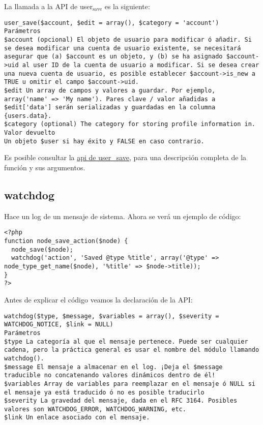\documentclass[11pt]{article}
\begin{document}
La llamada a la API de user$_{\mathrm{save}}$ es la siguiente:


\begin{verbatim}
user_save($account, $edit = array(), $category = 'account') 
Parámetros
$account (opcional) El objeto de usuario para modificar ó añadir. Si se desea modificar una cuenta de usuario existente, se necesitará asegurar que (a) $account es un objeto, y (b) se ha asignado $account->uid al user ID de la cuenta de usuario a modificar. Si se desea crear una nueva cuenta de usuario, es posible establecer $account->is_new a TRUE u omitir el campo $account->uid.
$edit Un array de campos y valores a guardar. Por ejemplo, array('name' => 'My name'). Pares clave / valor añadidas a $edit['data'] serán serializadas y guardadas en la columna {users.data}.
$category (optional) The category for storing profile information in.
Valor devuelto
Un objeto $user si hay éxito y FALSE en caso contrario.
\end{verbatim}



Es posible consultar la \href{http://api.drupal.org/api/drupal/modules--user--user.module/function/user_save}{api de user\_save}, para una descripción
completa de la función y sus argumentos.

\subsection{watchdog}
\label{sec-1.12}


Hace un log de un mensaje de sistema. Ahora se verá un ejemplo de código:


\begin{verbatim}
<?php
function node_save_action($node) {
  node_save($node);
  watchdog('action', 'Saved @type %title', array('@type' => node_type_get_name($node), '%title' => $node->title));
}
?>
\end{verbatim}



Antes de explicar el código veamos la declaración de la API:


\begin{verbatim}
watchdog($type, $message, $variables = array(), $severity = WATCHDOG_NOTICE, $link = NULL) 
Parámetros
$type La categoría al que el mensaje pertenece. Puede ser cualquier cadena, pero la práctica general es usar el nombre del módulo llamando watchdog().
$message El mensaje a almacenar en el log. ¡Deja el $message traducible no concatenando valores dinámicos dentro de él! 
$variables Array de variables para reemplazar en el mensaje ó NULL si el mensaje ya está traducido ó no es posible traducirlo
$severity La gravedad del mensaje, dada en el RFC 3164. Posibles valores son WATCHDOG_ERROR, WATCHDOG_WARNING, etc.
$link Un enlace asociado con el mensaje.
\end{verbatim}
\end{document}
